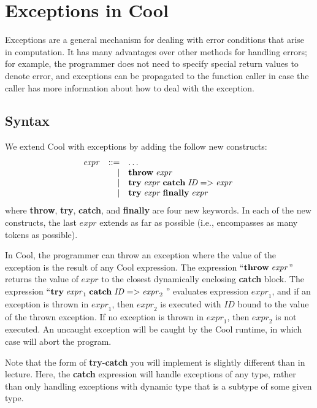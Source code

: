 \documentclass[11pt]{article}
\def\C#1{{\bf{}#1}}
\newcommand{\MVar}[1]{\ensuremath{\mathit{#1}}\xspace}
\newcommand{\expr}{\MVar{expr}}
\newcommand{\Throw}{\C{throw}\xspace}
\newcommand{\Try}{\C{try}\xspace}
\newcommand{\Catch}{\C{catch}\xspace}
\newcommand{\Finally}{\C{finally}\xspace}
\newcommand{\Arrow}{\mathrel{\mathbf{=>}}\xspace}
\newcommand{\ThrowE}[1]{\ensuremath{\Throw\;{#1}}\xspace}
\newcommand{\TryCatch}[3]{\ensuremath{\Try\;{#1}\;\Catch\;{#2}\Arrow{#3}\;}\xspace}
\newcommand{\TryFinally}[2]{\ensuremath{\Try\;{#1}\;\Finally\;{#2}\;}\xspace}
\newcommand{\Bnfdef}{\mathrel{::=}}
\newcommand{\Bnfalt}{\mid}
\begin{document}
\section{Exceptions in Cool}

Exceptions are a general mechanism for dealing with error conditions
that arise in computation. It has many advantages over other methods
for handling errors; for example, the programmer does not need to
specify special return values to denote error, and exceptions can be
propagated to the function caller in case the caller has more information
about how to deal with the exception.

\subsection{Syntax}

We extend Cool with exceptions by adding the follow new constructs:
\[ \begin{array}{rrl}
  \expr & \Bnfdef & \ldots \\
        & \Bnfalt & \ThrowE{\expr} \\
        & \Bnfalt & \TryCatch{\expr}{\MVar{ID}}{\expr} \\
        & \Bnfalt & \TryFinally{\expr}{\expr} \\

\end{array} \]
where \Throw, \Try, \Catch, and \Finally are four new keywords.  In
each of the new constructs, the last $\expr$ extends as far as
possible (i.e., encompasses as many tokens as possible).

In Cool, the programmer can throw an exception where the value of the
exception is the result of any Cool expression.  The expression
``\ThrowE{\expr}'' returns the value of $\expr$ to the closest
dynamically enclosing \Catch block.  The expression
``\TryCatch{\expr_1}{\MVar{ID}}{\expr_2}'' evaluates expression
$\expr_1$, and if an exception is thrown in $\expr_1$, then $\expr_2$
is executed with $\MVar{ID}$ bound to the value of the thrown exception.
If no exception is thrown in $\expr_1$, then $\expr_2$ is not executed.
An uncaught exception will be caught by the Cool runtime, in which
case will abort the program.

Note that the form of \Try-\Catch you will implement is slightly
different than in lecture.  Here, the \Catch expression will
handle exceptions of any type, rather than only handling exceptions
with dynamic type that is a subtype of some given type.
\end{document}
